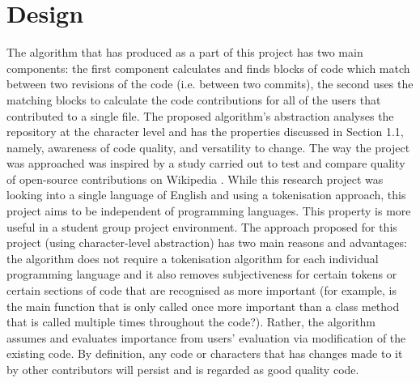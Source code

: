 \chapter{Design}
The algorithm that has produced as a part of this project has two main components: the first component calculates and finds blocks of code which match between two revisions of the code (i.e. between two commits), the second uses the matching blocks to calculate the code contributions for all of the users that contributed to a single file. The proposed algorithm's abstraction analyses the repository at the character level and has the properties discussed in Section 1.1, namely, awareness of code quality, and versatility to change. The way the project was approached was inspired by a study carried out to test and compare quality of open-source contributions on Wikipedia \citep{10.1145/1531674.1531682}. While this research project was looking into a single language of English and using a tokenisation approach, this project aims to be independent of programming languages. This property is more useful in a student group project environment. The approach proposed for this project (using character-level abstraction) has two main reasons and advantages: the algorithm does not require a tokenisation algorithm for each individual programming language and it also removes subjectiveness for certain tokens or certain sections of code that are recognised as more important (for example, is the main function that is only called once more important than a class method that is called multiple times throughout the code?). Rather, the algorithm assumes and evaluates importance from users' evaluation via modification of the existing code. By definition, any code or characters that has changes made to it by other contributors will persist and is regarded as good quality code.

